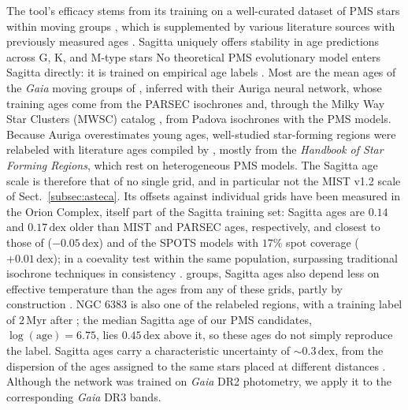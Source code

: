 \documentclass{aa}
\providecommand{\DIFaddtex}[1]{{\protect\color[rgb]{0,0,0.7}#1}} %
\providecommand{\DIFdeltex}[1]{{\protect\color[rgb]{0.65,0,0}\footnotesize #1}} %
\providecommand{\DIFaddbegin}{} %
\providecommand{\DIFaddend}{} %
\providecommand{\DIFdelbegin}{} %
\providecommand{\DIFdelend}{} %
\providecommand{\DIFadd}[1]{\texorpdfstring{\DIFaddtex{#1}}{#1}} %
\providecommand{\DIFdel}[1]{\texorpdfstring{\DIFdeltex{#1}}{}} %
\providecommand{\DIFscaledelfig}{0.5}
\newlength{\DIFdelgraphicswidth} %
\newlength{\DIFdelgraphicsheight} %
\providecommand{\DIFaddincludegraphics}[2][]{{\color{blue}\fbox{\DIFOincludegraphics[#1]{#2}}}} %
\providecommand{\DIFdelincludegraphics}[2][]{%
\sbox{\DIFdelgraphicsbox}{\DIFOincludegraphics[#1]{#2}}%
\settoboxwidth{\DIFdelgraphicswidth}{\DIFdelgraphicsbox} %
\settoboxtotalheight{\DIFdelgraphicsheight}{\DIFdelgraphicsbox} %
\scalebox{\DIFscaledelfig}{%
\parbox[b]{\DIFdelgraphicswidth}{\usebox{\DIFdelgraphicsbox}\\[-\baselineskip] \rule{\DIFdelgraphicswidth}{0em}}\llap{\resizebox{\DIFdelgraphicswidth}{\DIFdelgraphicsheight}{%
\setlength{\unitlength}{\DIFdelgraphicswidth}%
\begin{picture}(1,1)%
\thicklines\linethickness{2pt} %
{\color[rgb]{1,0,0}\put(0,0){\framebox(1,1){}}}%
{\color[rgb]{1,0,0}\put(0,0){\line( 1,1){1}}}%
{\color[rgb]{1,0,0}\put(0,1){\line(1,-1){1}}}%
\end{picture}%
}\hspace*{3pt}}} %
} %
\DeclareRobustCommand{\DIFaddbegin}{\DIFOaddbegin \let\includegraphics\DIFaddincludegraphics} %
\DeclareRobustCommand{\DIFaddend}{\DIFOaddend \let\includegraphics\DIFOincludegraphics} %
\DeclareRobustCommand{\DIFdelbegin}{\DIFOdelbegin \let\includegraphics\DIFdelincludegraphics} %
\DeclareRobustCommand{\DIFdelend}{\DIFOaddend \let\includegraphics\DIFOincludegraphics} %
\begin{document}
\DIFdelbegin \DIFdel{The tool's efficacy stems from its training on a well-curated dataset of PMS stars within moving groups \citep{2020AJ....160..279K}, which is supplemented by various literature sources with previously measured ages . Sagitta uniquely offers stability in age predictions across G, K, and M-type stars }\DIFdelend \DIFaddbegin \DIFadd{No theoretical PMS evolutionary model enters Sagitta directly: it is trained on empirical age labels \citep{2021AJ....162..282M}. Most are the mean ages of the \textit{Gaia} moving groups of \citet{2020AJ....160..279K}, inferred with their Auriga neural network, whose training ages come from the PARSEC isochrones \citep{2017ApJ...835...77M} and, through the Milky Way Star Clusters (MWSC) catalog \citep{2013A&A...558A..53K}, from Padova isochrones with the \citet{2000A&A...358..593S} PMS models. Because Auriga overestimates young ages, well-studied star-forming regions were relabeled with literature ages compiled by \citet{2021AJ....162..282M}, mostly from the \textit{Handbook of Star Forming Regions}, which rest on heterogeneous PMS models. The Sagitta age scale is therefore that of no single grid, and in particular not the \textsc{MIST} v1.2 scale of Sect.~\ref{subsec:asteca}. Its offsets against individual grids have been measured in the Orion Complex, itself part of the Sagitta training set: Sagitta ages are $0.14$ and $0.17\,\mathrm{dex}$ older than \textsc{MIST} and PARSEC ages, respectively, and closest to those of \citet{2015A&A...577A..42B} ($-0.05\,\mathrm{dex}$) and of the SPOTS models \citep{2020ApJ...891...29S} with $17\%$ spot coverage ($+0.01\,\mathrm{dex}$); in a coevality test }\DIFaddend within the same \DIFdelbegin \DIFdel{population, surpassing traditional isochrone techniques in consistency \citep{2023AJ....165..182K}. }\DIFdelend \DIFaddbegin \DIFadd{groups, Sagitta ages also depend less on effective temperature than the ages from any of these grids, partly by construction \citep{2023AJ....165..182K}. NGC 6383 is also one of the relabeled regions, with a training label of $2\,\mathrm{Myr}$ after \citet{2008hsf2.book..497R}; the median Sagitta age of our PMS candidates, $\log(\mathrm{age})=6.75$, lies $0.45\,\mathrm{dex}$ above it, so these ages do not simply reproduce the label. Sagitta ages carry a characteristic uncertainty of $\sim0.3\,\mathrm{dex}$, from the dispersion of the ages assigned to the same stars placed at different distances \citep{2021AJ....162..282M}. }\DIFaddend Although the network was trained on \textit{Gaia} DR2 photometry, we apply it to the corresponding \textit{Gaia} DR3 bands.
\end{document}
